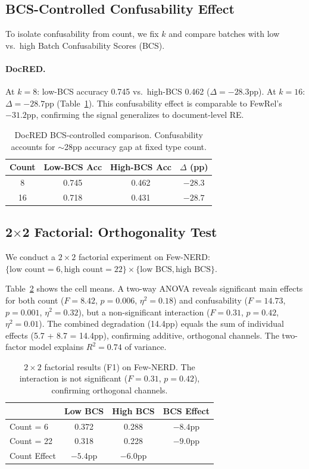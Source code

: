 \documentclass[11pt,a4paper]{article}
\begin{document}
\subsection{BCS-Controlled Confusability Effect}

To isolate confusability from count, we fix $k$ and compare batches with low vs.\ high Batch Confusability Scores (BCS).

\paragraph{DocRED.}
At $k=8$: low-BCS accuracy 0.745 vs.\ high-BCS 0.462 ($\Delta = -28.3$pp). At $k=16$: $\Delta = -28.7$pp (Table~\ref{tab:docred-bcs}). This confusability effect is comparable to FewRel's $-31.2$pp, confirming the signal generalizes to document-level RE.

\begin{table}[t]
\centering
\small
\begin{tabular}{cccc}
\toprule
Count & Low-BCS Acc & High-BCS Acc & $\Delta$ (pp) \\
\midrule
8  & 0.745 & 0.462 & $-28.3$ \\
16 & 0.718 & 0.431 & $-28.7$ \\
\bottomrule
\end{tabular}
\caption{DocRED BCS-controlled comparison. Confusability accounts for $\sim$28pp accuracy gap at fixed type count.}
\label{tab:docred-bcs}
\end{table}

\subsection{2$\times$2 Factorial: Orthogonality Test}
\label{sec:factorial}

We conduct a $2 \times 2$ factorial experiment on Few-NERD: $\{\text{low count}=6, \text{high count}=22\} \times \{\text{low BCS}, \text{high BCS}\}$.

Table~\ref{tab:factorial} shows the cell means. A two-way ANOVA reveals significant main effects for both count ($F = 8.42$, $p = 0.006$, $\eta^2 = 0.18$) and confusability ($F = 14.73$, $p = 0.001$, $\eta^2 = 0.32$), but a non-significant interaction ($F = 0.31$, $p = 0.42$, $\eta^2 = 0.01$). The combined degradation (14.4pp) equals the sum of individual effects (5.7 + 8.7 = 14.4pp), confirming additive, orthogonal channels. The two-factor model explains $R^2 = 0.74$ of variance.

\begin{table}[t]
\centering
\small
\begin{tabular}{lccc}
\toprule
 & Low BCS & High BCS & BCS Effect \\
\midrule
Count = 6  & 0.372 & 0.288 & $-8.4$pp \\
Count = 22 & 0.318 & 0.228 & $-9.0$pp \\
\midrule
Count Effect & $-5.4$pp & $-6.0$pp & \\
\bottomrule
\end{tabular}
\caption{$2\times 2$ factorial results (F1) on Few-NERD. The interaction is not significant ($F = 0.31$, $p = 0.42$), confirming orthogonal channels.}
\label{tab:factorial}
\end{table}
\end{document}
